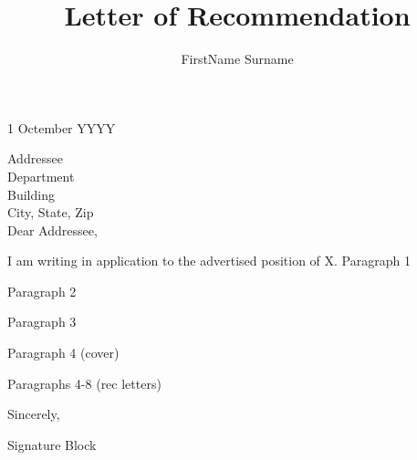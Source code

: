 \documentclass{letterhead}
\title{Letter of Recommendation}
\author{FirstName Surname}
\begin{document}

1 Octember YYYY

\medskip
Addressee\\
Department\\
Building\\
City, State, Zip\\

\medskip
Dear Addressee,

I am writing in application to the advertised position of X.
%
Paragraph 1

Paragraph 2

Paragraph 3

Paragraph 4 (cover)

Paragraphs 4-8 (rec letters)


Sincerely,


Signature Block
\end{document}

